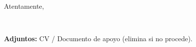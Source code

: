 \vspace{5pt}
Atentamente,

\vspace{18pt}
\textbf{\sendername}\\
{\small\color{muted}\senderrole}

\vfill
{\small\color{muted}\textbf{Adjuntos:} CV / Documento de apoyo (elimina si no procede).}
